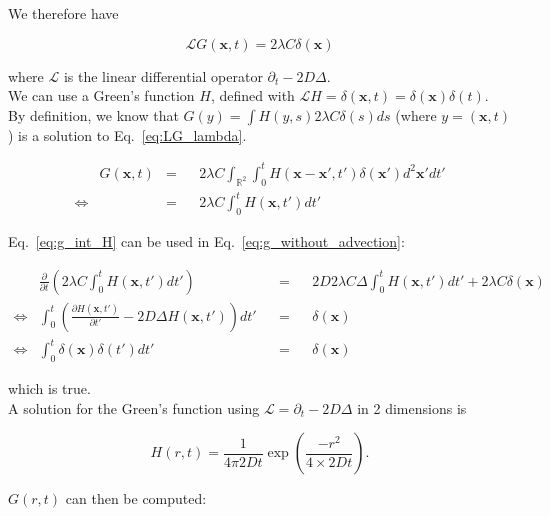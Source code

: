 We therefore have 

\begin{equation}
\mathcal{L}G(\boldsymbol{x},t)=2\lambda C\delta(\boldsymbol{x})\label{eq:LG_lambda}
\end{equation}

where $\mathcal{L}$ is the linear differential operator $\partial_{t}-2D\Delta$. \\

We can use a Green's function $H$, defined with $\mathcal{L}H=\delta(\boldsymbol{x},t)=\delta(\boldsymbol{x})\delta(t)$. \\

By definition, we know that $G(y)=\int H(y,s)2\lambda C\delta(s)ds$
(where $y=(\boldsymbol{x},t)$) is a solution to Eq.~\ref{eq:LG_lambda}.

\begin{align}
 & G(\boldsymbol{x},t) & = & & 2\lambda C\int_{\mathbb{R}^{2}}\int_{0}^{t}H(\boldsymbol{x}-\boldsymbol{x}',t')\delta(\boldsymbol{x}')d^2\boldsymbol{x}'dt'\nonumber \\
\Leftrightarrow &  & = &  & 2\lambda C\int_{0}^{t}H(\boldsymbol{x},t')dt'\label{eq:g_int_H}
\end{align}

Eq.~\ref{eq:g_int_H} can be used in Eq.~\ref{eq:g_without_advection}:

\begin{align}
 & \frac{\partial}{\partial t}\left(2\lambda C\int_{0}^{t}H(\boldsymbol{x},t')dt'\right) & & = & & 2D2\lambda C\Delta\int_{0}^{t}H(\boldsymbol{x},t')dt'+2\lambda C\delta(\boldsymbol{x})\\
\Leftrightarrow & \int_{0}^{t}\left(\frac{\partial H(\boldsymbol{x},t')}{\partial t'}-2D\Delta H(\boldsymbol{x},t')\right)dt' & & = & & \delta(\boldsymbol{x})\\
\Leftrightarrow & \int_{0}^{t}\delta(\boldsymbol{x})\delta(t')dt' & & = & & \delta(\boldsymbol{x})
\end{align}

which is true. \\

A solution for the Green's function using $\mathcal{L}=\partial_{t}-2D\Delta$
in 2 dimensions is 

\begin{equation}
H(r,t)=\frac{1}{4\pi2Dt}\exp\left(\frac{-r^{2}}{4\times2Dt}\right). 
\end{equation}

$G(r,t)$ can then be computed:

